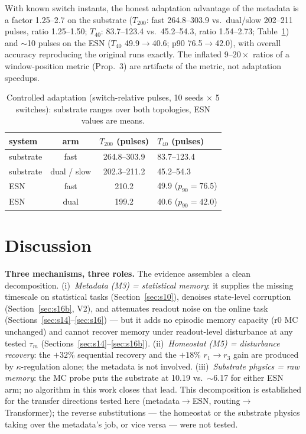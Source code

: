 \documentclass[preprint,12pt]{elsarticle}
\begin{document}
With known switch instants, the honest adaptation advantage of the
metadata is a factor 1.25--2.7 on the substrate ($T_{200}$: fast
264.8--303.9 vs.\ dual/slow 202--211 pulses, ratio 1.25--1.50; $T_{40}$:
83.7--123.4 vs.\ 45.2--54.3, ratio 1.54--2.73; Table~\ref{tab:adapt})
and $\sim$10 pulses on the
ESN ($T_{40}$ 49.9$\rightarrow$40.6; p90 76.5$\rightarrow$42.0), with
overall accuracy reproducing the original runs exactly.
The inflated $9$--$20\times$ ratios of a window-position metric
(Prop.~3) are artifacts of the metric, not adaptation speedups.

\begin{table}[t]
\centering
\small
\begin{tabular}{lccl}
\toprule
system & arm & $T_{200}$ (pulses) & $T_{40}$ (pulses) \\
\midrule
substrate & fast & 264.8--303.9 & 83.7--123.4 \\
substrate & dual / slow & 202.3--211.2 & 45.2--54.3 \\
ESN & fast & 210.2 & 49.9 ($p_{90}=76.5$) \\
ESN & dual & 199.2 & 40.6 ($p_{90}=42.0$) \\
\bottomrule
\end{tabular}
\caption{Controlled adaptation (switch-relative pulses, 10 seeds $\times$
5 switches): substrate ranges over both topologies, ESN values are means.}
\label{tab:adapt}
\end{table}

\section{Discussion}
\label{sec:disc}

\textbf{Three mechanisms, three roles.} The evidence assembles a clean
decomposition. (i)~\emph{Metadata (M3) = statistical memory}: it supplies
the missing timescale on statistical tasks (Section~\ref{sec:s10}),
denoises state-level corruption (Section~\ref{sec:s16b}, V2), and
attenuates readout noise on the online task (Sections~\ref{sec:s14}--\ref{sec:s16})
--- but it adds no episodic memory capacity (r0 MC unchanged) and cannot
recover memory under readout-level disturbance at any tested $\tau_m$
(Sections~\ref{sec:s14}--\ref{sec:s16b}). (ii)~\emph{Homeostat (M5) =
disturbance recovery}: the $+32\%$ sequential recovery and the $+18\%$
$r_1\!\to\!r_3$ gain are produced by $\kappa$-regulation alone; the
metadata is not involved. (iii)~\emph{Substrate physics = raw memory}: the
MC probe puts the substrate at 10.19 vs.\ $\sim$6.17 for either ESN arm;
no algorithm in this work closes that lead. This decomposition is
established for the transfer directions tested here
(metadata$\to$ESN, routing$\to$Transformer); the reverse substitutions
--- the homeostat or the substrate physics taking over the metadata's
job, or vice versa --- were not tested.
\end{document}
